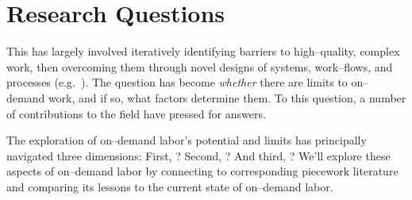 \documentclass[trackingWork]{subfiles}
\begin{document}
\section{Research Questions}

This has largely involved iteratively
identifying barriers to high--quality, complex work, then
overcoming them through novel designs of
systems, work--flows, and processes
(e.g.~\cite{bernsteinSoylent,foundry,crowdForgeKittur}).
The question 
has become \textit{whether} there are limits to on--demand work,
and if so, what factors determine them.
To this question, a number of contributions to the field have pressed for answers.

The exploration of on--demand labor's potential and limits has principally 
navigated three dimensions:
First, ?
Second, ?
And third, ?
We'll explore these aspects of on--demand labor by connecting to corresponding piecework literature
and comparing its lessons to the current state of on--demand labor.


\notinsubfile{
  
  
  
}

\onlyinsubfile{
  \printbibliography{}
}
\end{document}
